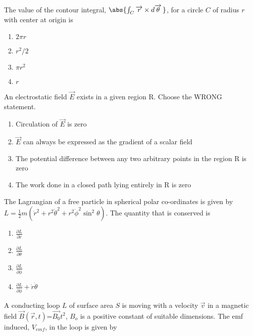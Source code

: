 \iffalse

\chapter{2009}
\section{ph}
\author{AI24BTECH11023 - Tarun Reddy Pakala}
\fi
    \item The value of the contour integral, $\abs{\int_{C} \overrightarrow{r} \times d\overrightarrow{\theta} \, }$, for a circle $C$ of radius $r$ with center at origin is
    \begin{enumerate}
    \item $2\pi r$
    \item $r^2/2$
    \item $\pi r^2$
    \item $r$
    \end{enumerate}
    \item An electrostatic field $\overrightarrow{E}$ exists in a given region R. Choose the WRONG statement.
    \begin{enumerate}
    \item Circulation of $\overrightarrow{E}$ is zero
    \item $\overrightarrow{E}$ can always be expressed as the gradient of a scalar field
    \item The potential difference between any two arbitrary points in the region R is zero
    \item The work  done in a closed path lying entirely in R is zero
    \end{enumerate}
    \item The Lagrangian of a free particle in spherical polar co-ordinates is given by $L = \frac{1}{2} m \left( \dot{r}^2 + r^2 \dot{\theta}^2 + r^2 \dot{\phi}^2 \sin^2 \theta \right)$. The quantity that is conserved is
    \begin{enumerate}
    \item $\frac{\partial L}{\partial \dot{r}}$
    \item $\frac{\partial L}{\partial \dot{\theta}}$
    \item $\frac{\partial L}{\partial \dot{\phi}}$
    \item $\frac{\partial L}{\partial \dot{\phi}} + \dot{r} \dot{\theta}$
    \end{enumerate}
    \item A conducting loop $L$ of surface area $S$ is moving with a velocity $\overrightarrow{v}$ in a magnetic field $\overrightarrow{B}(\overrightarrow{r},t)$=$\overrightarrow{B_0}t^2$, $B_o$ is a positive constant of suitable dimensions. The emf induced, $V_{emf}$, in the loop is given by
